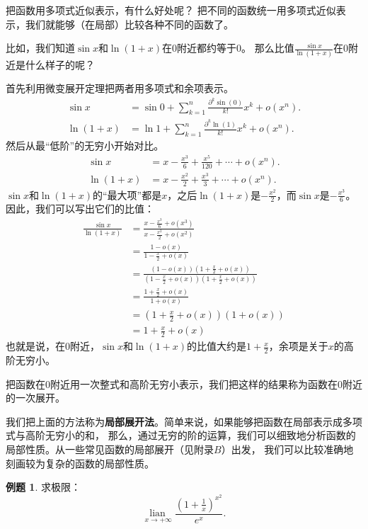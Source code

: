 \documentclass[12pt,UTF8]{ctexbook}
\newcommand{\lian}[1]{
    \underset{#1}{\operatorname{lian}\,}
}
\newcommand{\olim}[1]{\mathit{o}\left(#1\right)}  %
\theoremstyle{definition}
\newtheorem{et}{例题}[section]
\theoremstyle{plain}
\begin{document}
把函数用多项式近似表示，有什么好处呢？
把不同的函数统一用多项式近似表示，我们就能够（在局部）比较各种不同的函数了。

比如，我们知道$\sin{x}$和$\ln{(1+x)}$在$0$附近都约等于$0$。
那么比值$\frac{\sin{x}}{\ln{(1 + x)}}$在$0$附近是什么样子的呢？

首先利用微变展开定理把两者用多项式和余项表示。
\begin{align*}
    \sin{x} &= \sin{0} + \sum_{k=1}^n \frac{\partial^k \sin (0)}{k!}x^k + \mathit{o}(x^n).  \\
    \ln{(1 + x)} &= \ln{1} + \sum_{k=1}^n \frac{\partial^k \ln (1)}{k!}x^k + \mathit{o}(x^n).  
\end{align*}
然后从最“低阶”的无穷小开始对比。
\begin{align*}
    \sin{x} &= x - \frac{x^3}{6} + \frac{x^5}{120} + \cdots + \mathit{o}(x^n).  \\
    \ln{(1 + x)} &= x - \frac{x^2}{2} + \frac{x^3}{3} + \cdots + \mathit{o}(x^n). 
\end{align*}
$\sin{x}$和$\ln{(1+x)}$的“最大项”都是$x$，之后$\ln{(1+x)}$是$- \frac{x^2}{2}$，而$\sin{x}$是$- \frac{x^3}{6}$。
因此，我们可以写出它们的比值：
\begin{align*}
    \frac{\sin{x}}{\ln{(1 + x)}} &= \frac{x - \frac{x^3}{6} + \olim{x^3}}{x - \frac{x^2}{2} + \olim{x^2}}  \\
    &= \frac{1 - \olim{x}}{1 - \frac{x}{2} + \olim{x}}  \\
    &= \frac{(1 - \olim{x})\left(1 + \frac{x}{2} + \olim{x}\right)}{\left(1 - \frac{x}{2} + \olim{x}\right)\left(1 + \frac{x}{2} + \olim{x}\right)}  \\
    &= \frac{1 + \frac{x}{2} + \olim{x}}{1 + \olim{x}}  \\
    &= \left(1 + \frac{x}{2} + \olim{x}\right)(1 + \olim{x})  \\
    &= 1 + \frac{x}{2} + \olim{x} 
\end{align*}
也就是说，在$0$附近，$\sin{x}$和$\ln{(1+x)}$的比值大约是$1 + \frac{x}{2}$，余项是关于$x$的高阶无穷小。

把函数在$0$附近用一次整式和高阶无穷小表示，我们把这样的结果称为函数在$0$附近的一次展开。

我们把上面的方法称为\textbf{局部展开法}。简单来说，如果能够把函数在局部表示成多项式与高阶无穷小的和，
那么，通过无穷的阶的运算，我们可以细致地分析函数的局部性质。从一些常见函数的局部展开（见附录$B$）出发，
我们可以比较准确地刻画较为复杂的函数的局部性质。

\begin{et}
    求极限：
    $$ \lian{x\to +\infty} \frac{\left(1 + \frac{1}{x}\right)^{x^2}}{e^x}.$$
\end{et}
\end{document}
